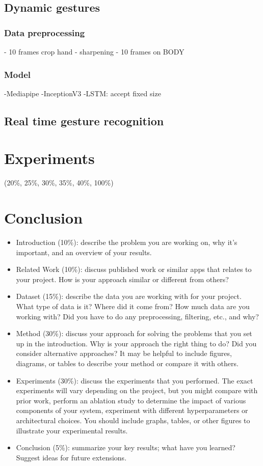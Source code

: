 \documentclass[10pt,twocolumn,letterpaper]{article}
\begin{document}
\subsection{Dynamic gestures}
\subsubsection{Data preprocessing}
- 10 frames crop hand
- sharpening
- 10 frames on BODY
\subsubsection{Model}
-Mediapipe
-InceptionV3
-LSTM: accept fixed size
\subsection{Real time gesture recognition}

\section{Experiments}
(20\%, 25\%, 30\%, 35\%, 40\%, 100\%)

\section{Conclusion}



\begin{itemize}
	\item Introduction (10\%): describe the problem you are working on, why it's important, and an overview of your results.
	\item Related Work (10\%): discuss published work or similar apps that relates to your project. How is your approach similar or different from others?
	\item Dataset (15\%): describe the data you are working with for your project. What type of data is it? Where did it come from? How much data are you working with? Did you have to do any preprocessing, filtering, etc., and why?
	\item Method (30\%): discuss your approach for solving the problems that you set up in the introduction. Why is your approach the right thing to do? Did you consider alternative approaches? It may be helpful to include figures, diagrams, or tables to describe your method or compare it with others.
	\item Experiments (30\%): discuss the experiments that you performed. The exact experiments will vary depending on the project, but you might compare with prior work, perform an ablation study to determine the impact of various components of your system, experiment with different hyperparameters or architectural choices. You should include graphs, tables, or other figures to illustrate your experimental results.
	\item Conclusion (5\%): summarize your key results; what have you learned? Suggest ideas for future extensions.
\end{itemize}	
\end{document}
